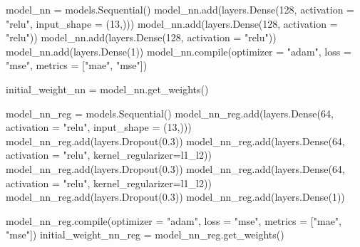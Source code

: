 \documentclass[
  letterpaper,
  DIV=11,
  numbers=noendperiod]{scrreprt}
\newenvironment{Shaded}{\begin{snugshade}}{\end{snugshade}}
\newcommand{\BuiltInTok}[1]{\textcolor[rgb]{0.00,0.23,0.31}{#1}}
\newcommand{\DecValTok}[1]{\textcolor[rgb]{0.68,0.00,0.00}{#1}}
\newcommand{\FloatTok}[1]{\textcolor[rgb]{0.68,0.00,0.00}{#1}}
\newcommand{\NormalTok}[1]{\textcolor[rgb]{0.00,0.23,0.31}{#1}}
\newcommand{\OperatorTok}[1]{\textcolor[rgb]{0.37,0.37,0.37}{#1}}
\newcommand{\StringTok}[1]{\textcolor[rgb]{0.13,0.47,0.30}{#1}}
\begin{document}
\begin{Shaded}
\begin{Highlighting}[]
\NormalTok{model\_nn }\OperatorTok{=}\NormalTok{ models.Sequential()}
\NormalTok{model\_nn.add(layers.Dense(}\DecValTok{128}\NormalTok{, activation }\OperatorTok{=} \StringTok{"relu"}\NormalTok{, input\_shape }\OperatorTok{=}\NormalTok{ (}\DecValTok{13}\NormalTok{,)))}
\NormalTok{model\_nn.add(layers.Dense(}\DecValTok{128}\NormalTok{, activation }\OperatorTok{=} \StringTok{"relu"}\NormalTok{))}
\NormalTok{model\_nn.add(layers.Dense(}\DecValTok{128}\NormalTok{, activation }\OperatorTok{=} \StringTok{"relu"}\NormalTok{))}
\NormalTok{model\_nn.add(layers.Dense(}\DecValTok{1}\NormalTok{))}
\NormalTok{model\_nn.}\BuiltInTok{compile}\NormalTok{(optimizer }\OperatorTok{=} \StringTok{"adam"}\NormalTok{, loss }\OperatorTok{=} \StringTok{"mse"}\NormalTok{, metrics }\OperatorTok{=}\NormalTok{ [}\StringTok{"mae"}\NormalTok{, }\StringTok{"mse"}\NormalTok{])}

\NormalTok{initial\_weight\_nn }\OperatorTok{=}\NormalTok{ model\_nn.get\_weights()}
\end{Highlighting}
\end{Shaded}

\begin{Shaded}
\begin{Highlighting}[]
\NormalTok{model\_nn\_reg }\OperatorTok{=}\NormalTok{ models.Sequential()}
\NormalTok{model\_nn\_reg.add(layers.Dense(}\DecValTok{64}\NormalTok{, activation }\OperatorTok{=} \StringTok{"relu"}\NormalTok{, input\_shape }\OperatorTok{=}\NormalTok{ (}\DecValTok{13}\NormalTok{,)))}
\NormalTok{model\_nn\_reg.add(layers.Dropout(}\FloatTok{0.3}\NormalTok{))}
\NormalTok{model\_nn\_reg.add(layers.Dense(}\DecValTok{64}\NormalTok{, activation }\OperatorTok{=} \StringTok{"relu"}\NormalTok{, kernel\_regularizer}\OperatorTok{=}\StringTok{\textquotesingle{}l1\_l2\textquotesingle{}}\NormalTok{))}
\NormalTok{model\_nn\_reg.add(layers.Dropout(}\FloatTok{0.3}\NormalTok{))}
\NormalTok{model\_nn\_reg.add(layers.Dense(}\DecValTok{64}\NormalTok{, activation }\OperatorTok{=} \StringTok{"relu"}\NormalTok{, kernel\_regularizer}\OperatorTok{=}\StringTok{\textquotesingle{}l1\_l2\textquotesingle{}}\NormalTok{))}
\NormalTok{model\_nn\_reg.add(layers.Dropout(}\FloatTok{0.3}\NormalTok{))}
\NormalTok{model\_nn\_reg.add(layers.Dense(}\DecValTok{1}\NormalTok{))}

\NormalTok{model\_nn\_reg.}\BuiltInTok{compile}\NormalTok{(optimizer }\OperatorTok{=} \StringTok{"adam"}\NormalTok{, loss }\OperatorTok{=} \StringTok{"mse"}\NormalTok{, metrics }\OperatorTok{=}\NormalTok{ [}\StringTok{"mae"}\NormalTok{, }\StringTok{"mse"}\NormalTok{])}
\NormalTok{initial\_weight\_nn\_reg }\OperatorTok{=}\NormalTok{ model\_nn\_reg.get\_weights()}
\end{Highlighting}
\end{Shaded}
\end{document}

